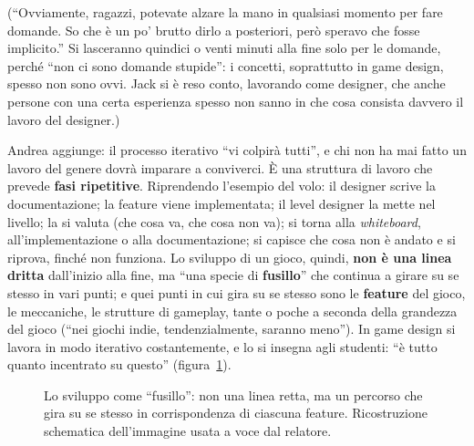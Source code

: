 (``Ovviamente, ragazzi, potevate alzare la mano in qualsiasi momento per fare
domande. So che è un po' brutto dirlo a posteriori, però speravo che fosse
implicito.'' Si lasceranno quindici o venti minuti alla fine solo per le
domande, perché ``non ci sono domande stupide'': i concetti, soprattutto in
game design, spesso non sono ovvi. Jack si è reso conto, lavorando come
designer, che anche persone con una certa esperienza spesso non sanno in che
cosa consista davvero il lavoro del designer.)

Andrea aggiunge: il processo iterativo ``vi colpirà tutti'', e chi non ha
mai fatto un lavoro del genere dovrà imparare a conviverci. È una struttura
di lavoro che prevede \textbf{fasi ripetitive}. Riprendendo l'esempio del
volo: il designer scrive la documentazione; la feature viene implementata;
il level designer la mette nel livello; la si valuta (che cosa va, che cosa
non va); si torna alla \emph{whiteboard}, all'implementazione o alla
documentazione; si capisce che cosa non è andato e si riprova, finché non
funziona. Lo sviluppo di un gioco, quindi, \textbf{non è una linea dritta}
dall'inizio alla fine, ma ``una specie di \textbf{fusillo}'' che continua a
girare su se stesso in vari punti; e quei punti in cui gira su se stesso
sono le \textbf{feature} del gioco, le meccaniche, le strutture di gameplay,
tante o poche a seconda della grandezza del gioco (``nei giochi indie,
tendenzialmente, saranno meno''). In game design si lavora in modo iterativo
costantemente, e lo si insegna agli studenti: ``è tutto quanto incentrato su
questo'' (figura~\ref{p2:fig:fusillo}).

\begin{figure}[htbp]
\centering
{}
\caption{Lo sviluppo come ``fusillo'': non una linea retta, ma un percorso
che gira su se stesso in corrispondenza di ciascuna feature. Ricostruzione
schematica dell'immagine usata a voce dal relatore.}
\label{p2:fig:fusillo}
\end{figure}

